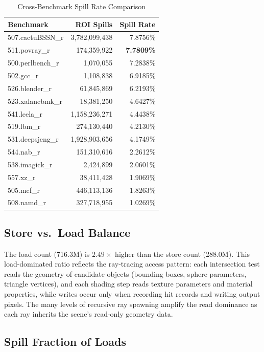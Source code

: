 \documentclass[conference]{IEEEtran}
\begin{document}
\begin{table}[H]
\centering
\caption{Cross-Benchmark Spill Rate Comparison}
\label{tab:compare}
\begin{tabular}{lrr}
\toprule
\textbf{Benchmark} & \textbf{ROI Spills} & \textbf{Spill Rate} \\
\midrule
507.cactuBSSN\_r & 3,782,099,438 & 7.8756\% \\
511.povray\_r    &   174,359,922 & \textbf{7.7809\%} \\
500.perlbench\_r &     1,070,055 & 7.2838\% \\
502.gcc\_r       &     1,108,838 & 6.9185\% \\
526.blender\_r   &    61,845,869 & 6.2193\% \\
523.xalancbmk\_r &    18,381,250 & 4.6427\% \\
541.leela\_r     & 1,158,236,271 & 4.4438\% \\
519.lbm\_r       &   274,130,440 & 4.2130\% \\
531.deepsjeng\_r & 1,928,903,656 & 4.1749\% \\
544.nab\_r       &   151,310,616 & 2.2612\% \\
538.imagick\_r   &     2,424,899 & 2.0601\% \\
557.xz\_r        &    38,411,428 & 1.9069\% \\
505.mcf\_r       &   446,113,136 & 1.8263\% \\
508.namd\_r      &   327,718,955 & 1.0269\% \\
\bottomrule
\end{tabular}
\end{table}

\subsection{Store vs.\ Load Balance}

The load count (716.3M) is $2.49\times$ higher than the store count
(288.0M). This load-dominated ratio reflects the ray-tracing access
pattern: each intersection test reads the geometry of candidate
objects (bounding boxes, sphere parameters, triangle vertices), and
each shading step reads texture parameters and material properties,
while writes occur only when recording hit records and writing output
pixels. The many levels of recursive ray spawning amplify the read
dominance as each ray inherits the scene's read-only geometry data.

\subsection{Spill Fraction of Loads}
\end{document}
